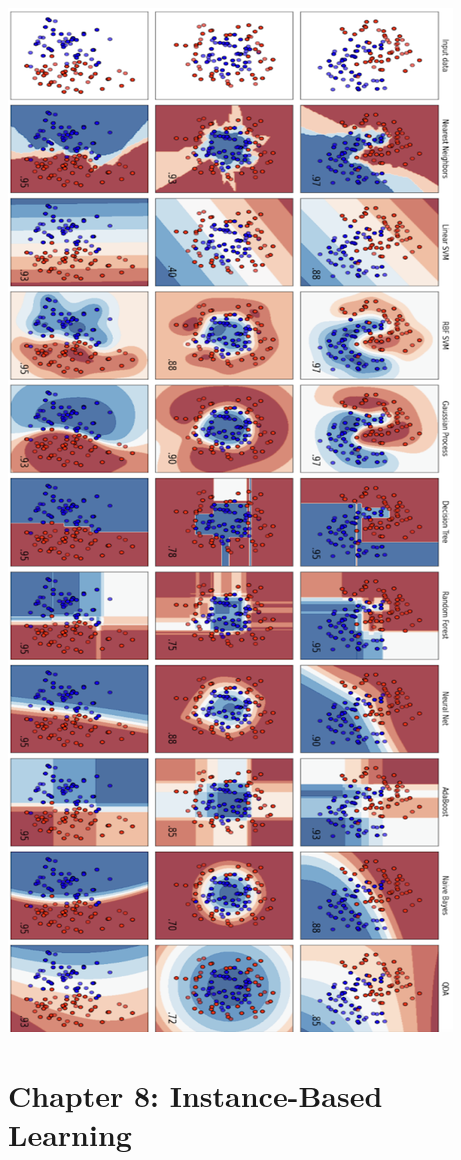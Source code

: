 \documentclass[10pt,a4paper]{article}
\begin{document}
\includegraphics[scale=0.8]{Screenshot 2025-01-09 at 17.35.36.png}
\section*{Chapter 8: Instance-Based Learning}
\end{document}
